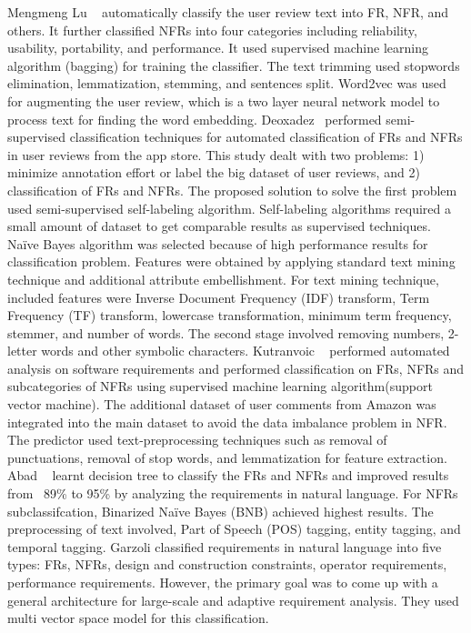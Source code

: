 Mengmeng Lu \etal~ \cite{Lu:2017} automatically classify the user review text into FR, NFR, and others. It further classified NFRs into four categories including reliability, usability, portability, and performance. It used supervised machine learning algorithm (bagging) for training the classifier. The text trimming used stopwords elimination, lemmatization, stemming, and sentences split. Word2vec was used for augmenting the user review, which is a two layer neural network model to process text for finding the word embedding. Deoxadez \etal~\cite{Deocadez:2017}performed semi-supervised classification techniques for automated classification of FRs and NFRs in user reviews from the app store. This study dealt with two problems: 1) minimize annotation effort or label the big dataset of user reviews, and 2) classification of FRs and NFRs. The proposed solution to solve the first problem used semi-supervised self-labeling algorithm. Self-labeling algorithms required a small amount of dataset to get comparable results as supervised techniques. Naïve Bayes algorithm was selected because of high performance results for classification problem. Features were obtained by applying standard text mining technique and additional attribute embellishment. For text mining technique, included features were Inverse Document Frequency (IDF) transform, Term Frequency (TF) transform, lowercase transformation, minimum term frequency, stemmer, and number of words. The second stage involved removing numbers, 2- letter words and other symbolic characters. Kutranvoic \etal ~ \cite {Kurtanovic:2017}performed automated analysis on software requirements and performed classification on FRs, NFRs and subcategories of NFRs using supervised machine learning algorithm(support vector machine). The additional dataset of user comments from Amazon was integrated into the main dataset to avoid the data imbalance problem in NFR. The predictor used text-preprocessing techniques such as removal of punctuations, removal of stop words, and lemmatization for feature extraction. Abad                       
\etal ~ \cite{Abad:2017} learnt decision tree to classify the FRs and NFRs and improved results from ~89\% to 95\% by analyzing the requirements in natural language. For NFRs subclassifcation, Binarized Naïve Bayes (BNB) achieved highest results. The preprocessing of text involved, Part of Speech (POS) tagging, entity tagging, and temporal tagging. Garzoli \cite {Garzoli:2013} classified requirements in natural language into five types: FRs, NFRs, design and construction constraints, operator requirements, performance requirements. However, the primary goal was to come up with a general architecture for large-scale and adaptive requirement analysis. They used multi vector space model for this classification.\\



